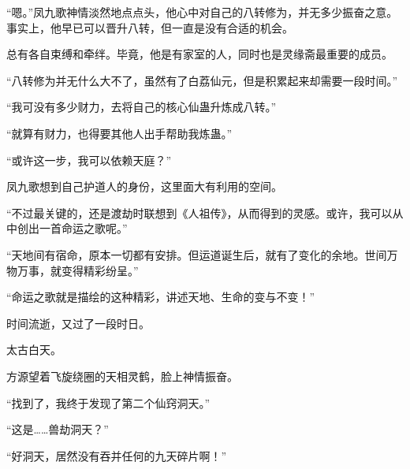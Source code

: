 \begin{this_body}
“嗯。”凤九歌神情淡然地点点头，他心中对自己的八转修为，并无多少振奋之意。事实上，他早已可以晋升八转，但一直是没有合适的机会。

总有各自束缚和牵绊。毕竟，他是有家室的人，同时也是灵缘斋最重要的成员。

“八转修为并无什么大不了，虽然有了白荔仙元，但是积累起来却需要一段时间。”

“我可没有多少财力，去将自己的核心仙蛊升炼成八转。”

“就算有财力，也得要其他人出手帮助我炼蛊。”

“或许这一步，我可以依赖天庭？”

凤九歌想到自己护道人的身份，这里面大有利用的空间。

“不过最关键的，还是渡劫时联想到《人祖传》，从而得到的灵感。或许，我可以从中创出一首命运之歌呢。”

“天地间有宿命，原本一切都有安排。但运道诞生后，就有了变化的余地。世间万物万事，就变得精彩纷呈。”

“命运之歌就是描绘的这种精彩，讲述天地、生命的变与不变！”

时间流逝，又过了一段时日。

太古白天。

方源望着飞旋绕圈的天相灵鹤，脸上神情振奋。

“找到了，我终于发现了第二个仙窍洞天。”

“这是……兽劫洞天？”

“好洞天，居然没有吞并任何的九天碎片啊！”

\end{this_body}

